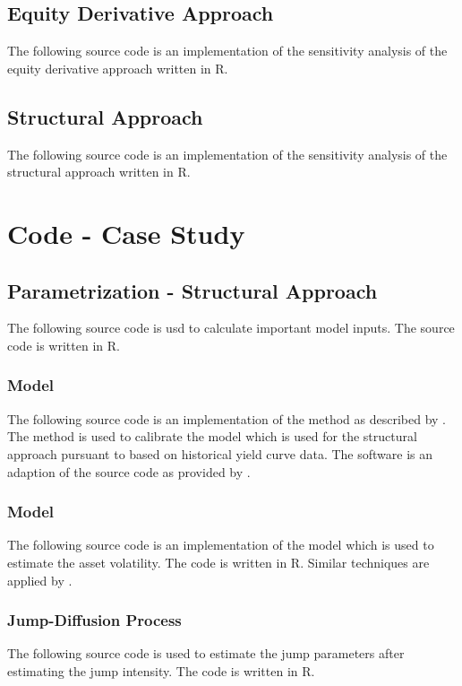 \section{Equity Derivative Approach} \label{sensiequity}

The following source code is an implementation of the sensitivity analysis of the equity derivative approach \citep{de2011pricing} written in R.
 


\section{Structural Approach} \label{sensistructural}

The following source code is an implementation of the sensitivity analysis of the structural approach \citep{pennacchi2010structural} written in R.
 


\chapter{Code - Case Study}

\section{Parametrization - Structural Approach} \label{empirical}
The following source code is usd to calculate important model inputs. The source code is written in R.


\subsection{\citet{cox1985theory} Model}

The following source code is an implementation of the method as described by \citet{remillard2013statistical}. The method is used to calibrate the \citet{cox1985theory} model which is used for the structural approach pursuant to \citet{pennacchi2010structural} based on historical yield curve data. The software is an adaption of the source code as provided by \citet{calibrateCIR}.

\label{estimateCIRParameter}

\subsection{\citet{merton1974pricing} Model}
The following source code is an implementation of the \citet{merton1974pricing} model which is used to estimate the asset volatility. The code is written in R. Similar techniques are applied by \citet{stackoverflow2014code}.
\label{estimateMertonParameter}

\subsection{Jump-Diffusion Process}
The following source code is used to estimate the jump parameters after estimating the jump intensity. The code is written in R.
\label{estimateJumpsParameter}


